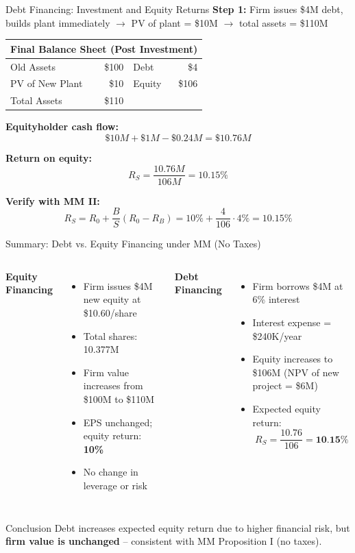 \begin{frame}{Debt Financing: Investment and Equity Returns}
	\small
	\textbf{Step 1:} Firm issues \$4M debt, builds plant immediately  
	$\rightarrow$ PV of plant = \$10M $\rightarrow$ total assets = \$110M
	
	\begin{table}
		\centering
		\begin{tabular}{lrlr}
			\toprule
			\multicolumn{4}{c}{\textbf{Final Balance Sheet (Post Investment)}} \\ \midrule
			Old Assets        & \$100 & Debt   & \$4   \\
			PV of New Plant   & \$10  & Equity & \$106 \\
			Total Assets      & \$110 &        &       \\ \bottomrule
		\end{tabular}
	\end{table}
	
	\textbf{Equityholder cash flow:}  
	\[
	\$10M + \$1M - \$0.24M = \$10.76M
	\]
	
	\textbf{Return on equity:}
	\[
	R_S = \frac{10.76M}{106M} = 10.15\%
	\]
	
	\textbf{Verify with MM II:}
	\[
	R_S = R_0 + \frac{B}{S}(R_0 - R_B) = 10\% + \frac{4}{106} \cdot 4\% = 10.15\%
	\]
\end{frame}

\begin{frame}{Summary: Debt vs. Equity Financing under MM (No Taxes)}
	
	\begin{columns}[T]
		\textbf{Equity Financing}
		\begin{itemize}
			\item Firm issues \$4M new equity at \$10.60/share
			\item Total shares: 10.377M
			\item Firm value increases from \$100M to \$110M
			\item EPS unchanged; equity return: \textbf{10\%}
			\item No change in leverage or risk
		\end{itemize}
		
		\textbf{Debt Financing}
		\begin{itemize}
			\item Firm borrows \$4M at 6\% interest
			\item Interest expense = \$240K/year
			\item Equity increases to \$106M (NPV of new project = \$6M)
			\item Expected equity return:
			\[
			R_S = \frac{10.76}{106} = \textbf{10.15\%}
			\]
		\end{itemize}
	\end{columns}
	
	\begin{alertblock}{Conclusion}
		\small
		Debt increases expected equity return due to higher financial risk, but \textbf{firm value is unchanged} -- consistent with MM Proposition I (no taxes).
	\end{alertblock}
	
\end{frame}

